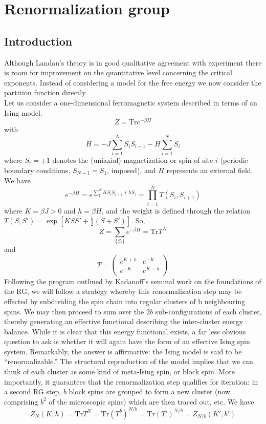 \section{Renormalization group}
\subsection{Introduction}
Although Landau's theory is in good qualitative agreement with experiment there is room for improvement on the quantitative level concerning the critical exponents.
Instead of considering a model for the free energy we now consider the partition function directly. 
\\
Let us consider a one-dimensional ferromagnetic system described in terms of an Ising model.
\[Z = \mathrm{Tr}e^{-\beta H}\]
with
\[H = -J\sum_{i=1}^N S_i S_{i+1} - H\sum_{i=1}^N S_i\]
where $S_i = \pm 1$ denotes the (uniaxial) magnetization or spin of site $i$ (periodic boundary conditions, $S_{N+1} = S_1$, imposed), and $H$ represents an external field. We have
\[e^{-\beta H} = e^{\sum_{1}^N KS_iS_{i+1} + hS_i} = \prod_{i=1}^N T(S_i,S_{i+1})\]
where $K = \beta J > 0$ and $h = \beta H$, and the weight is defined through the relation $T(S,S') = \exp[KSS' + \frac{h}{2}(S+S')]$. So,
\[Z = \sum_{\{S_i\}} e^{-\beta H} = \mathrm{Tr}T^N\]
and
\[T = \begin{pmatrix}
e^{K+h} & e^{-K} \\ e^{-K} & e^{K-h}
\end{pmatrix}\]
Following the program outlined by Kadanoff's seminal work on the foundations of the RG, we will follow a strategy whereby this renormalization step may be effected by subdividing the spin chain into regular clusters of b neighbouring spins. We may then proceed to sum over the $2b$ sub-configurations of each cluster, thereby generating an effective functional describing the inter-cluster energy balance. 
While it is clear that this energy functional exists, a far less obvious question to ask is whether it will again have the form of an effective Ising spin system. Remarkably, the answer is affirmative: the Ising model is said to be ``renormalizable.'' 
The structural reproduction of the model implies that we can think of each cluster as some kind of meta-Ising spin, or block spin. More importantly, it guarantees that the renormalization step qualifies for iteration: in a second RG step, $b$ block spins are grouped to form a new cluster (now comprising $b^2$ of the microscopic spins) which are then traced out, etc. We have
\[Z_{N}(K,h) = \mathrm{Tr} T^N = \mathrm{Tr} (T^b)^{N/b} =\mathrm{Tr} (T')^{N/b} = Z_{N/b}(K',b')\]
